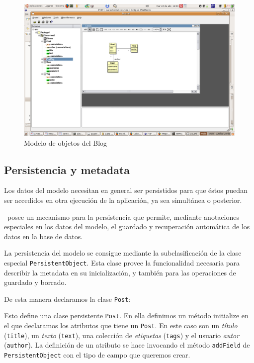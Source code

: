 \begin{figure}[ht]
	\centering
	\includegraphics*[scale=0.50,viewport=420 350 700 600]{images/diagrama.png}
 	\caption{Modelo de objetos del Blog}
 	\label{fig-model1}
\end{figure}


\subsection{Persistencia y metadata}
\label{sub-pers}

Los datos del modelo necesitan en general ser persistidos para que éstos puedan ser accedidos en otra ejecución de la aplicación, ya sea simultánea o posterior.

\PWB \ posee un mecanismo para la persistencia que permite, mediante anotaciones especiales en los datos del modelo, el guardado y recuperación automática de los datos en la base de datos.

La persistencia del modelo se consigue mediante la subclasificación de la clase especial \verb"PersistentObject". Esta clase provee la funcionalidad necesaria para describir la metadata en su inicialización, y también para las operaciones de guardado y borrado.

De esta manera declaramos la clase \verb"Post":


Esto define una clase persistente \verb"Post". En ella definimos un método initialize en el que declaramos los atributos que tiene un \verb"Post". En este caso son un \emph{título} (\verb"title"), un \emph{texto} (\verb"text"), una colección de \emph{etiquetas} (\verb"tags") y el usuario \emph{autor} (\verb"author"). La definición de un atributo se hace invocando el método \verb"addField" de \verb"PersistentObject" con el tipo de campo que queremos crear.

